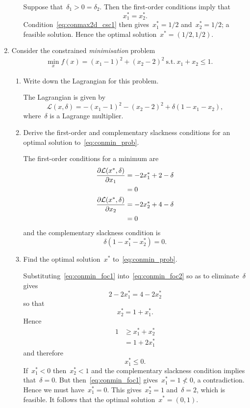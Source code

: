 \begin{enumerate}
\begin{enumerate}
\begin{solution}
			Suppose that~$\delta_1>0=\delta_2$.
			Then the first-order conditions imply that
			\[ x_1^*=x_2^*. \]
			Condition~\eqref{eq:conmax2d_csc1} then gives~$x_1^*=1/2$ and~$x_2^*=1/2$; a feasible solution.
			Hence the optimal solution~$x^*=(1/2,1/2)$.
		\end{solution}

	\end{enumerate}

	\item
	Consider the constrained \emph{minimisation} problem
	\begin{align}
		\min_xf(x)=(x_1-1)^2+(x_2-2)^2\ \text{s.t.}\ x_1+x_2\le1.
			\label{eq:conmin_prob}
	\end{align}
	\begin{enumerate}

		\item
		Write down the Lagrangian for this problem.
		\begin{solution}
			The Lagrangian is given by
			\[ \mathcal{L}(x,\delta)
				=-(x_1-1)^2-(x_2-2)^2+\delta(1-x_1-x_2), \]
			where~$\delta$ is a Lagrange multiplier.
		\end{solution}

		\item
		Derive the first-order and complementary slackness conditions for an optimal solution to~\eqref{eq:conmin_prob}.
		\begin{solution}
			The first-order conditions for a minimum are
			\begin{align}
				\frac{\partial\mathcal{L}(x^*,\delta)}{\partial x_1}
				&= -2x_1^*+2-\delta\\
				&= 0 \label{eq:conmin_foc1}\\
				\frac{\partial\mathcal{L}(x^*,\delta)}{\partial x_2}
				&= -2x_2^*+4-\delta\\
				&= 0 \label{eq:conmin_foc2}
			\end{align}
			and the complementary slackness condition is
			\[ \delta(1-x_1^*-x_2^*)=0. \]
		\end{solution}

		\item
		Find the optimal solution~$x^*$ to~\eqref{eq:conmin_prob}.
		\begin{solution}
			Substituting~\eqref{eq:conmin_foc1} into~\eqref{eq:conmin_foc2} so as to eliminate~$\delta$ gives
			\[ 2-2x_1^*=4-2x_2^* \]
			so that
			\[ x_2^*=1+x_1^*. \]
			Hence
			\begin{align}
				1
				&\ge x_1^*+x_2^*\\
				&= 1+2x_1^*
			\end{align}
			and therefore
			\[ x_1^*\le0. \]
			If~$x_1^*<0$ then~$x_2^*<1$ and the complementary slackness condition implies that~$\delta=0$.
			But then~\eqref{eq:conmin_foc1} gives~$x_1^*=1\not<0$, a contradiction.
			Hence we must have~$x_1^*=0$.
			This gives~$x_2^*=1$ and~$\delta=2$, which is feasible.
			It follows that the optimal solution~$x^*=(0,1)$.
		\end{solution}


\end{enumerate}
\end{enumerate}
